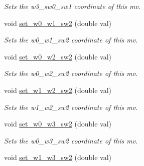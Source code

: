 \begin{DoxyCompactItemize}
\begin{DoxyCompactList}\small\item\em Sets the w3\-\_\-sw0\-\_\-sw1 coordinate of this mv. \end{DoxyCompactList}\item 
\hypertarget{classe3ga_1_1mv_afcc601c37ada0703b4c44c57a195bb07}{void \hyperlink{classe3ga_1_1mv_afcc601c37ada0703b4c44c57a195bb07}{set\-\_\-w0\-\_\-w1\-\_\-sw2} (double val)}\label{classe3ga_1_1mv_afcc601c37ada0703b4c44c57a195bb07}

\begin{DoxyCompactList}\small\item\em Sets the w0\-\_\-w1\-\_\-sw2 coordinate of this mv. \end{DoxyCompactList}\item 
\hypertarget{classe3ga_1_1mv_a585743c551fb8cdcaca035b037470580}{void \hyperlink{classe3ga_1_1mv_a585743c551fb8cdcaca035b037470580}{set\-\_\-w0\-\_\-w2\-\_\-sw2} (double val)}\label{classe3ga_1_1mv_a585743c551fb8cdcaca035b037470580}

\begin{DoxyCompactList}\small\item\em Sets the w0\-\_\-w2\-\_\-sw2 coordinate of this mv. \end{DoxyCompactList}\item 
\hypertarget{classe3ga_1_1mv_a8bad2fe7105152a8b3deea3526af4d4a}{void \hyperlink{classe3ga_1_1mv_a8bad2fe7105152a8b3deea3526af4d4a}{set\-\_\-w1\-\_\-w2\-\_\-sw2} (double val)}\label{classe3ga_1_1mv_a8bad2fe7105152a8b3deea3526af4d4a}

\begin{DoxyCompactList}\small\item\em Sets the w1\-\_\-w2\-\_\-sw2 coordinate of this mv. \end{DoxyCompactList}\item 
\hypertarget{classe3ga_1_1mv_a68f0ae1422ceadba59626c8e327914f5}{void \hyperlink{classe3ga_1_1mv_a68f0ae1422ceadba59626c8e327914f5}{set\-\_\-w0\-\_\-w3\-\_\-sw2} (double val)}\label{classe3ga_1_1mv_a68f0ae1422ceadba59626c8e327914f5}

\begin{DoxyCompactList}\small\item\em Sets the w0\-\_\-w3\-\_\-sw2 coordinate of this mv. \end{DoxyCompactList}\item 
\hypertarget{classe3ga_1_1mv_a86599af66894ad56f4c4703f90e03b30}{void \hyperlink{classe3ga_1_1mv_a86599af66894ad56f4c4703f90e03b30}{set\-\_\-w1\-\_\-w3\-\_\-sw2} (double val)}\label{classe3ga_1_1mv_a86599af66894ad56f4c4703f90e03b30}


\end{DoxyCompactItemize}
